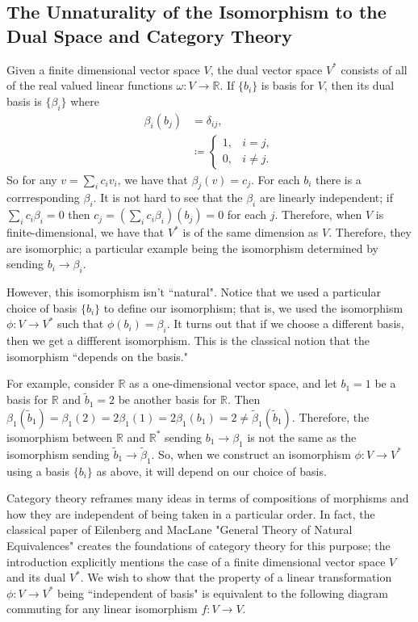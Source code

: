 \subsection{The Unnaturality of the Isomorphism to the Dual Space and Category Theory}

Given a finite dimensional vector space \(V\), the dual vector space \(V^*\) consists of all of the real valued linear functions \(\omega : V \to \mathbb R\). If \(\{b_i\}\) is basis
for \(V\), then its dual basis is \(\{\beta_i\}\) where 
\begin{align}
\beta_i(b_j) & =  \delta_{ij}, \\
    & \coloneqq \begin{cases} 1, & i = j, \\ 0, & i \neq j. \end{cases}
\end{align}
So for any \(v = \sum_i c_i v_i\), we have that \(\beta_j(v) = c_j\). For each \(b_i\) there is a corrresponding \(\beta_i\). It is not hard to see that the \(\beta_i\) are linearly
independent; if \(\sum_i c_i \beta_i = 0\) then \(c_j = (\sum_i c_i \beta_i)(b_j) = 0\) for each \(j\). Therefore, when \(V\) is finite-dimensional, we have that
\(V^*\) is of the same dimension as \(V\). Therefore, they are isomorphic; a particular example being the isomorphism determined by sending \(b_i \to \beta_i\).

However, this isomorphism isn't ``natural". Notice that we used a particular choice of basis \(\{b_i\}\) to define our isomorphism; that is, we used the isomorphism \(\phi : V \to V^*\) 
such that \(\phi(b_i) = \beta_i\). It turns out that if we choose a different basis, then we get a diffferent isomorphism. This is the classical notion that the isomorphism ``depends
on the basis."

For example, consider \(\mathbb R\) as a one-dimensional vector space, and let \(b_1 = 1\) be a basis for \(\mathbb R\) and \(\tilde b_1 = 2\) be another basis for \(\mathbb R\).
Then \(\beta_1(\tilde b_1) = \beta_1(2) = 2\beta_1(1) = 2\beta_1(b_1) = 2 \neq \tilde\beta_1(\tilde b_1)\). Therefore, the isomorphism between \(\mathbb R\) and \(\mathbb R^*\)
sending \(b_1 \to \beta_1\) is not the same as the isomorphism sending \(\tilde b_1 \to \tilde \beta_1\). So, when we construct an isomorphism \(\phi : V \to V^*\) using a basis
\(\{b_i\}\) as above, it will depend on our choice of basis.

Category theory reframes many ideas in terms of compositions of morphisms and how they are independent of being taken in a particular order. In fact, the classical paper of Eilenberg
and MacLane "General Theory of Natural Equivalences" \cite{eilenbergMaclane} creates the foundations of category theory for this purpose; the introduction explicitly mentions the case of a finite
dimensional
vector space \(V\) and its dual \(V^*\). We wish to show that the property of a linear transformation \(\phi : V \to V^*\) being ``independent of basis" is equivalent to the following
diagram commuting for any linear isomorphism \(f: V \to V\).

